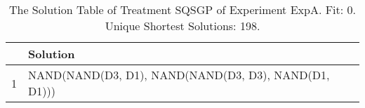 \begin{table}[ht]
\centering
\begin{tabular}{rp{9cm}}
  \hline
 & Solution \\ 
  \hline
1 & NAND(NAND(D3, D1), NAND(NAND(D3, D3), NAND(D1, D1))) \\ 
   \hline
\end{tabular}
\caption{The Solution Table of Treatment SQSGP of Experiment ExpA. Fit: 0. Unique Shortest Solutions: 198.} 
\end{table}
